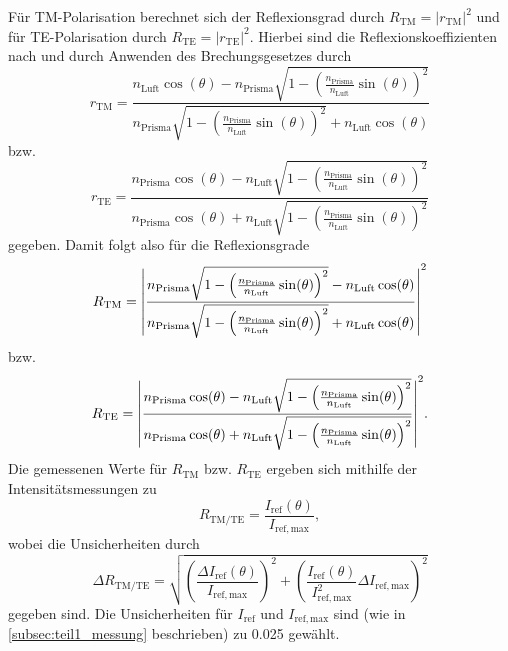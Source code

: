 Für TM-Polarisation berechnet sich der Reflexionsgrad durch $R_{\mathrm{TM}} = |r_{\mathrm{TM}}|^2$ und für TE-Polarisation durch $R_{\mathrm{TE}} = |r_{\mathrm{TE}}|^2$.
Hierbei sind die Reflexionskoeffizienten nach \cite{linden_optik} und durch Anwenden des Brechungsgesetzes durch
\begin{equation}
    r_{\mathrm{TM}} = \frac{n_{\mathrm{Luft}}\cos(\theta) - n_{\mathrm{Prisma}}\sqrt{1 - \left(\frac{n_{\mathrm{Prisma}}}{n_{\mathrm{Luft}}}\sin(\theta)\right)^2}}{n_{\mathrm{Prisma}}\sqrt{1 - \left(\frac{n_{\mathrm{Prisma}}}{n_{\mathrm{Luft}}}\sin(\theta)\right)^2} + n_{\mathrm{Luft}}\cos(\theta)}
\end{equation} bzw.
\begin{equation}
    r_{\mathrm{TE}} = \frac{n_{\mathrm{Prisma}}\cos(\theta) - n_{\mathrm{Luft}}\sqrt{1 - \left(\frac{n_{\mathrm{Prisma}}}{n_{\mathrm{Luft}}}\sin(\theta)\right)^2}}{n_{\mathrm{Prisma}}\cos(\theta) + n_{\mathrm{Luft}}\sqrt{1 - \left(\frac{n_{\mathrm{Prisma}}}{n_{\mathrm{Luft}}}\sin(\theta)\right)^2}}
\end{equation} gegeben. Damit folgt also für die Reflexionsgrade
\begin{equation}\label{eq:reflexionsgrad_tm}
    R_{\mathrm{TM}} = \abs{\frac{n_{\mathrm{Prisma}}\sqrt{1 - \left(\frac{n_{\mathrm{Prisma}}}{n_{\mathrm{Luft}}}\sin(\theta)\right)^2} - n_{\mathrm{Luft}}\cos(\theta)}{n_{\mathrm{Prisma}}\sqrt{1 - \left(\frac{n_{\mathrm{Prisma}}}{n_{\mathrm{Luft}}}\sin(\theta)\right)^2} + n_{\mathrm{Luft}}\cos(\theta)}}^2
\end{equation} bzw.
\begin{equation}\label{eq:reflexionsgrad_te}
    R_{\mathrm{TE}} = \abs{\frac{n_{\mathrm{Prisma}}\cos(\theta) - n_{\mathrm{Luft}}\sqrt{1 - \left(\frac{n_{\mathrm{Prisma}}}{n_{\mathrm{Luft}}}\sin(\theta)\right)^2}}{n_{\mathrm{Prisma}}\cos(\theta) + n_{\mathrm{Luft}}\sqrt{1 - \left(\frac{n_{\mathrm{Prisma}}}{n_{\mathrm{Luft}}}\sin(\theta)\right)^2}}}^2 .
\end{equation} Die gemessenen Werte für $R_{\mathrm{TM}}$ bzw. $R_{\mathrm{TE}}$ ergeben sich mithilfe der Intensitätsmessungen zu
\begin{equation}\label{eq:reflexionsgrad_gemessen}
    R_{\mathrm{TM/TE}} = \frac{I_{\mathrm{ref}}(\theta)}{I_{\mathrm{ref,max}}} ,
\end{equation} wobei die Unsicherheiten durch
\begin{equation*}
    \Delta R_{\mathrm{TM/TE}} = \sqrt{\left(\frac{\Delta I_{\mathrm{ref}}(\theta)}{I_{\mathrm{ref,max}}}\right)^2 + \left(\frac{I_{\mathrm{ref}}(\theta)}{I_{\mathrm{ref,max}}^2}\Delta I_{\mathrm{ref,max}}\right)^2}
\end{equation*} gegeben sind. Die Unsicherheiten für $I_{\mathrm{ref}}$ und $I_{\mathrm{ref,max}}$ sind (wie in \cref{subsec:teil1_messung} beschrieben) zu \SI{0.025}{\we} gewählt.
